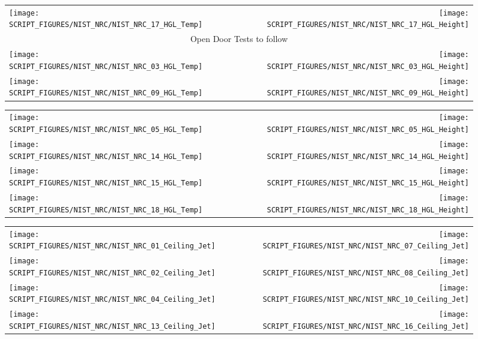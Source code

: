 \clearpage

\begin{figure}[p]
\begin{tabular*}{\textwidth}{l@{\extracolsep{\fill}}r}
\texttt{[image: SCRIPT\_FIGURES/NIST\_NRC/NIST\_NRC\_17\_HGL\_Temp]} &
\texttt{[image: SCRIPT\_FIGURES/NIST\_NRC/NIST\_NRC\_17\_HGL\_Height]} \\
\multicolumn{2}{c}{Open Door Tests to follow} \\
\texttt{[image: SCRIPT\_FIGURES/NIST\_NRC/NIST\_NRC\_03\_HGL\_Temp]} &
\texttt{[image: SCRIPT\_FIGURES/NIST\_NRC/NIST\_NRC\_03\_HGL\_Height]} \\
\texttt{[image: SCRIPT\_FIGURES/NIST\_NRC/NIST\_NRC\_09\_HGL\_Temp]} &
\texttt{[image: SCRIPT\_FIGURES/NIST\_NRC/NIST\_NRC\_09\_HGL\_Height]}
\end{tabular*}
\end{figure}

\begin{figure}[p]
\begin{tabular*}{\textwidth}{l@{\extracolsep{\fill}}r}
\texttt{[image: SCRIPT\_FIGURES/NIST\_NRC/NIST\_NRC\_05\_HGL\_Temp]} &
\texttt{[image: SCRIPT\_FIGURES/NIST\_NRC/NIST\_NRC\_05\_HGL\_Height]} \\
\texttt{[image: SCRIPT\_FIGURES/NIST\_NRC/NIST\_NRC\_14\_HGL\_Temp]} &
\texttt{[image: SCRIPT\_FIGURES/NIST\_NRC/NIST\_NRC\_14\_HGL\_Height]} \\
\texttt{[image: SCRIPT\_FIGURES/NIST\_NRC/NIST\_NRC\_15\_HGL\_Temp]} &
\texttt{[image: SCRIPT\_FIGURES/NIST\_NRC/NIST\_NRC\_15\_HGL\_Height]} \\
\texttt{[image: SCRIPT\_FIGURES/NIST\_NRC/NIST\_NRC\_18\_HGL\_Temp]} &
\texttt{[image: SCRIPT\_FIGURES/NIST\_NRC/NIST\_NRC\_18\_HGL\_Height]}
\end{tabular*}
\end{figure}

\clearpage

\begin{figure}[p]
\begin{tabular*}{\textwidth}{l@{\extracolsep{\fill}}r}
\texttt{[image: SCRIPT\_FIGURES/NIST\_NRC/NIST\_NRC\_01\_Ceiling\_Jet]} &
\texttt{[image: SCRIPT\_FIGURES/NIST\_NRC/NIST\_NRC\_07\_Ceiling\_Jet]} \\
\texttt{[image: SCRIPT\_FIGURES/NIST\_NRC/NIST\_NRC\_02\_Ceiling\_Jet]} &
\texttt{[image: SCRIPT\_FIGURES/NIST\_NRC/NIST\_NRC\_08\_Ceiling\_Jet]} \\
\texttt{[image: SCRIPT\_FIGURES/NIST\_NRC/NIST\_NRC\_04\_Ceiling\_Jet]} &
\texttt{[image: SCRIPT\_FIGURES/NIST\_NRC/NIST\_NRC\_10\_Ceiling\_Jet]} \\
\texttt{[image: SCRIPT\_FIGURES/NIST\_NRC/NIST\_NRC\_13\_Ceiling\_Jet]} &
\texttt{[image: SCRIPT\_FIGURES/NIST\_NRC/NIST\_NRC\_16\_Ceiling\_Jet]}
\end{tabular*}
\label{NIST_NRC_Jet_Closed}
\end{figure}

